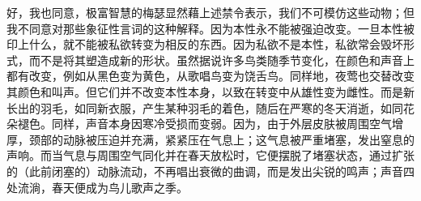 好，我也同意，极富智慧的梅瑟显然藉上述禁令表示，我们不可模仿这些动物；但我不同意对那些象征性言词的这种解释。因为本性永不能被强迫改变。一旦本性被印上什么，就不能被私欲转变为相反的东西。因为私欲不是本性，私欲常会毁坏形式，而不是将其塑造成新的形状。虽然据说许多鸟类随季节变化，在颜色和声音上都有改变，例如从黑色变为黄色，从歌唱鸟变为饶舌鸟。同样地，夜莺也交替改变其颜色和叫声。但它们并不改变本性本身，以致在转变中从雄性变为雌性。而是新长出的羽毛，如同新衣服，产生某种羽毛的着色，随后在严寒的冬天消逝，如同花朵褪色。同样，声音本身因寒冷受损而变弱。因为，由于外层皮肤被周围空气增厚，颈部的动脉被压迫并充满，紧紧压在气息上；这气息被严重堵塞，发出窒息的声响。而当气息与周围空气同化并在春天放松时，它便摆脱了堵塞状态，通过扩张的（此前闭塞的）动脉流动，不再唱出衰微的曲调，而是发出尖锐的鸣声；声音四处流淌，春天便成为鸟儿歌声之季。\par

